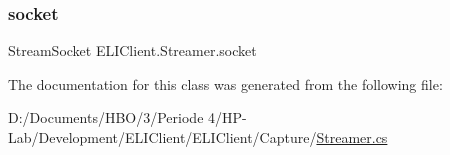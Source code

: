 \mbox{\label{class_e_l_i_client_1_1_streamer_a3f9f039a53e135e6545efe8e336d23a6}} 
\subsubsection{\texorpdfstring{socket}{socket}}
{\footnotesize\ttfamily Stream\+Socket E\+L\+I\+Client.\+Streamer.\+socket\hspace{0.3cm}{\ttfamily [private]}}



The documentation for this class was generated from the following file\+:\begin{DoxyCompactItemize}
\item 
D\+:/\+Documents/\+H\+B\+O/3/\+Periode 4/\+H\+P-\/\+Lab/\+Development/\+E\+L\+I\+Client/\+E\+L\+I\+Client/\+Capture/\hyperlink{_streamer_8cs}{Streamer.\+cs}\end{DoxyCompactItemize}
